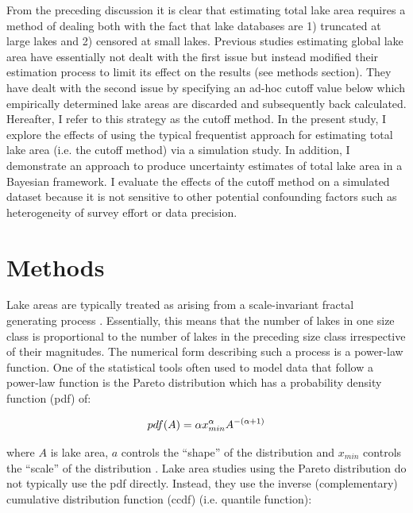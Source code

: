 \documentclass{article}
\begin{document}
From the preceding discussion it is clear that estimating total lake area requires a method of dealing both with the fact that lake databases are 1) truncated at large lakes and 2) censored at small lakes. Previous studies estimating global lake area have essentially not dealt with the first issue but instead modified their estimation process to limit its effect on the results (see methods section). They have dealt with the second issue by specifying an ad-hoc cutoff value below which empirically determined lake areas are discarded and subsequently back calculated. Hereafter, I refer to this strategy as the cutoff method. In the present study, I explore the effects of using the typical frequentist approach for estimating total lake area (i.e. the cutoff method) via a simulation study. In addition, I demonstrate an approach to produce uncertainty estimates of total lake area in a Bayesian framework. I evaluate the effects of the cutoff method on a simulated dataset because it is not sensitive to other potential confounding factors such as heterogeneity of survey effort or data precision.

\section{Methods}

Lake areas are typically treated as arising from a scale-invariant fractal generating process \citep{winslowDoesLakeSize2015, downingGlobalAbundanceSize2006, mcdonald_regional_2012, goodchildLakesFractalSurfaces1988, hamiltonEstimationFractalDimension1992}. Essentially, this means that the number of lakes in one size class is proportional to the number of lakes in the preceding size class irrespective of their magnitudes. The numerical form describing such a process is a power-law function. One of the statistical tools often used to model data that follow a power-law function is the Pareto distribution which has a probability density function (pdf) of:

\begin{equation}
    pdf(A) = \alpha x_{min}^{\alpha}A^{-(\alpha+1)} \\
  \label{eqn:pareto_pdf}
\end{equation}

where $A$ is lake area, $a$ controls the “shape” of the distribution and $x_{min}$ controls the “scale” of the distribution \citep{shaliziAdvancedDataAnalysis2017}. Lake area studies using the Pareto distribution do not typically use the pdf directly. Instead, they use the inverse (complementary) cumulative distribution function (ccdf) (i.e. quantile function):
\end{document}
